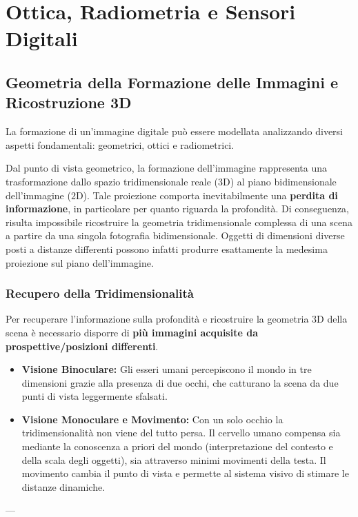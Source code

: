 \chapter{Ottica, Radiometria e Sensori Digitali}

\section{Geometria della Formazione delle Immagini e Ricostruzione 3D}

La formazione di un'immagine digitale può essere modellata analizzando diversi aspetti fondamentali: geometrici, ottici e radiometrici. 

Dal punto di vista geometrico, la formazione dell'immagine rappresenta una trasformazione dallo spazio tridimensionale reale ($3\text{D}$) al piano bidimensionale dell'immagine ($2\text{D}$). Tale proiezione comporta inevitabilmente una \textbf{perdita di informazione}, in particolare per quanto riguarda la profondità. Di conseguenza, risulta impossibile ricostruire la geometria tridimensionale complessa di una scena a partire da una singola fotografia bidimensionale. Oggetti di dimensioni diverse posti a distanze differenti possono infatti produrre esattamente la medesima proiezione sul piano dell'immagine.

\subsection{Recupero della Tridimensionalità}
Per recuperare l'informazione sulla profondità e ricostruire la geometria $3\text{D}$ della scena è necessario disporre di \textbf{più immagini acquisite da prospettive/posizioni differenti}. 
\begin{itemize}
    \item \textbf{Visione Binoculare:} Gli esseri umani percepiscono il mondo in tre dimensioni grazie alla presenza di due occhi, che catturano la scena da due punti di vista leggermente sfalsati.
    \item \textbf{Visione Monoculare e Movimento:} Con un solo occhio la tridimensionalità non viene del tutto persa. Il cervello umano compensa sia mediante la conoscenza a priori del mondo (interpretazione del contesto e della scala degli oggetti), sia attraverso minimi movimenti della testa. Il movimento cambia il punto di vista e permette al sistema visivo di stimare le distanze dinamiche.
\end{itemize}

---

